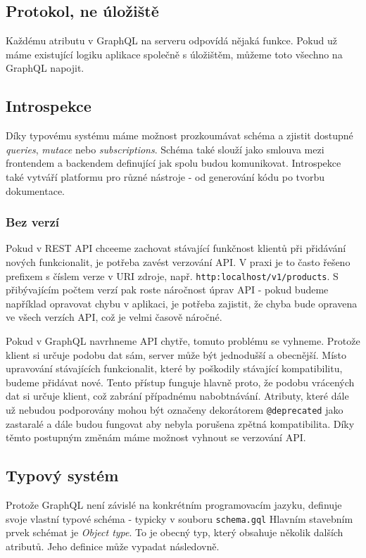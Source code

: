 \documentclass[thesis=M,czech]{FITthesis}[2019/12/23]
\begin{document}
\subsection*{Protokol, ne úložiště}
Každému atributu v GraphQL na serveru odpovídá nějaká funkce. Pokud už máme existující logiku aplikace společně s úložištěm, můžeme toto všechno na GraphQL napojit.

\subsection*{Introspekce}
Díky typovému systému máme možnost prozkoumávat schéma a zjistit dostupné \textit{queries}, \textit{mutace} nebo \textit{subscriptions}. Schéma také slouží jako smlouva mezi frontendem a backendem definující jak spolu budou komunikovat.
Introspekce také vytváří platformu pro různé nástroje - od generování kódu po tvorbu dokumentace.

\subsubsection*{Bez verzí}
Pokud v REST API chceeme zachovat stávající funkčnost klientů při přidávání nových funkcionalit, je potřeba zavést verzování API. V praxi je to často řešeno prefixem s číslem verze v URI zdroje, např. \texttt{http:localhost/v1/products}. S přibývajícím počtem verzí pak roste náročnost úprav API - pokud budeme například opravovat chybu v aplikaci, je potřeba zajistit, že chyba bude opravena ve všech verzích API, což je velmi časově náročné.

Pokud v GraphQL navrhneme API chytře, tomuto problému se vyhneme. Protože klient si určuje podobu dat sám, server může být jednodušší a obecnější. Místo upravování stávajících funkcionalit, které by poškodily stávající kompatibilitu, budeme přidávat nové. Tento přístup funguje hlavně proto, že podobu vrácených dat si určuje klient, což zabrání případnému nabobtnávání. Atributy, které dále už nebudou podporovány mohou být označeny dekorátorem \texttt{@deprecated} jako zastaralé a dále budou fungovat aby nebyla porušena zpětná kompatibilita. Díky těmto postupným změnám máme možnost vyhnout se verzování API.

\subsection{Typový systém}
Protože GraphQL není závislé na konkrétním programovacím jazyku, definuje svoje vlastní typové schéma - typicky v souboru \texttt{schema.gql}
Hlavním stavebním prvek schémat je \textit{Object type}. To je obecný typ, který obsahuje několik dalších atributů. Jeho definice může vypadat následovně. 
\end{document}
